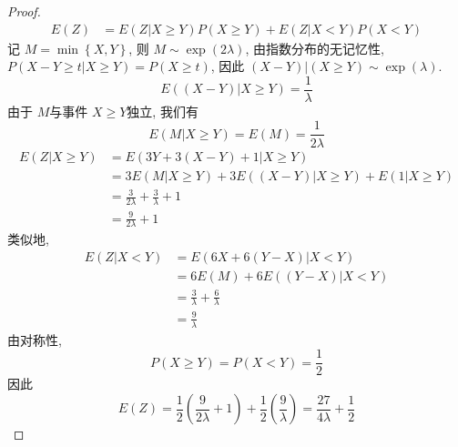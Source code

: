 \documentclass[../main.tex]{subfiles}
\begin{document}
\begin{proof}
      \[
      \begin{aligned}
      E\left( Z \right)&=E\left( Z|X\ge Y \right)P\left( X\ge Y \right)+ E\left( Z| X< Y \right)P\left( X< Y \right)      
      \end{aligned}
      \]记 \(  M= \min \left\{ X,Y \right\}  \), 则 \(  M\sim \exp \left( 2 \lambda  \right)   \), 由指数分布的无记忆性, \(  P\left( X-Y\ge t| X\ge Y \right)= P\left( X\ge t \right)    \),  因此  \(  \left( X-Y \right)| \left( X\ge Y \right)    \sim \exp \left(  \lambda  \right) \).   \[
      E\left( \left( X-Y \right)|X\ge Y  \right)= \frac{1 }{ \lambda  }  
      \]  由于 \(  M  \)与事件 \(  X\ge Y  \)独立, 我们有 \[
      E\left( M|X\ge Y \right)= E\left( M \right)= \frac{1 }{2 \lambda  }   
      \] \[
    \begin{aligned}
      E\left( Z|X\ge Y \right)&= E\left( 3Y+ 3\left( X-Y \right)+ 1|X\ge Y  \right) \\ 
       &= 3E\left( M|X\ge Y \right)+ 3 E\left( \left( X-Y \right)|X\ge Y  \right)+ E\left( 1|X\ge Y \right)  \\ 
        &= \frac{3 }{2 \lambda  }+ \frac{3 }{ \lambda  }+ 1\\ 
         &= \frac{9 }{2 \lambda  }+ 1   
    \end{aligned}    
      \]类似地,  \[
      \begin{aligned}
      E\left( Z|X< Y \right)&= E\left( 6X+ 6\left( Y-X \right)|X< Y  \right)\\ 
       &= 6E\left( M \right)+ 6E\left( \left( Y-X \right)|X< Y  \right) \\ 
        &= \frac{3 }{ \lambda  }+ \frac{6 }{ \lambda  }\\ 
         &= \frac{9 }{ \lambda  }        
      \end{aligned}
      \]由对称性,  \[
      P\left( X\ge Y \right)= P\left( X< Y \right)= \frac{1}{2}  
      \]因此 \[
      E\left( Z \right)= \frac{1}{2}\left( \frac{9 }{2 \lambda  }+ 1  \right)+ \frac{1}{2}\left( \frac{9 }{ \lambda  }  \right)= \frac{27 }{4 \lambda  }+ \frac{1}{2}   
      \]
\end{proof}
\end{document}
